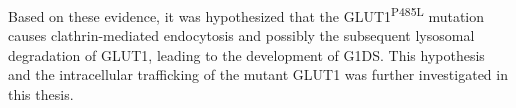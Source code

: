 Based on these evidence, it was hypothesized that the GLUT1\textsuperscript{P485L} mutation causes clathrin-mediated endocytosis and possibly the subsequent lysosomal degradation of GLUT1, leading to the development of G1DS. This hypothesis and the intracellular trafficking of the mutant GLUT1 was further investigated in this thesis.

